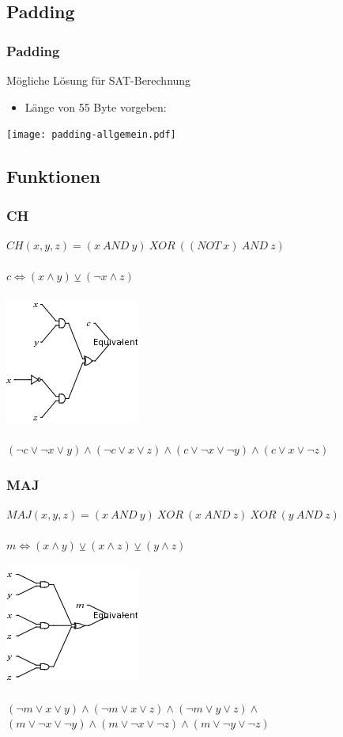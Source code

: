 \documentclass{beamer}
\begin{document}
  \subsection{Padding}
    \begin{frame}
      \frametitle{Padding}
      Mögliche Lösung für SAT-Berechnung\\
      \begin{itemize}
       \item Länge von 55 Byte vorgeben:
      \end{itemize}
      \texttt{[image: padding-allgemein.pdf]}
    \end{frame}
  \subsection{Funktionen}
    \begin{frame}
      \frametitle{CH}
      $ CH( x, y, z) = (x~AND~y)~XOR~( (NOT~x)~AND~z) $\\
      ~\\
      $ c \Leftrightarrow (x \wedge y) \veebar ( \neg x \wedge z) $\\
      ~\\
      \includegraphics[scale=0.5]{ch.png}\\
      ~\\
      $ (\neg c \vee \neg x \vee y) \wedge (\neg c \vee x \vee z) \wedge (c \vee \neg x \vee \neg y) \wedge (c \vee x \vee \neg z) $
    \end{frame}
    \begin{frame}
      \frametitle{MAJ}
      $ MAJ( x, y, z) = (x~AND~y)~XOR~(x~AND~z)~XOR~(y~AND~z) $\\
      ~\\
      $ m \Leftrightarrow (x \wedge y) \veebar (x \wedge z) \veebar (y \wedge z) $\\
      ~\\
      \includegraphics[scale=0.5]{maj.png}\\
      ~\\
      $ (\neg m \vee x \vee y) \wedge  (\neg m \vee x \vee z) \wedge (\neg m \vee y \vee z) \wedge $\\
      $ (m \vee \neg x \vee \neg y) \wedge (m \vee \neg x \vee \neg z) \wedge (m \vee \neg y \vee \neg z) $
      \end{frame}
\end{document}

